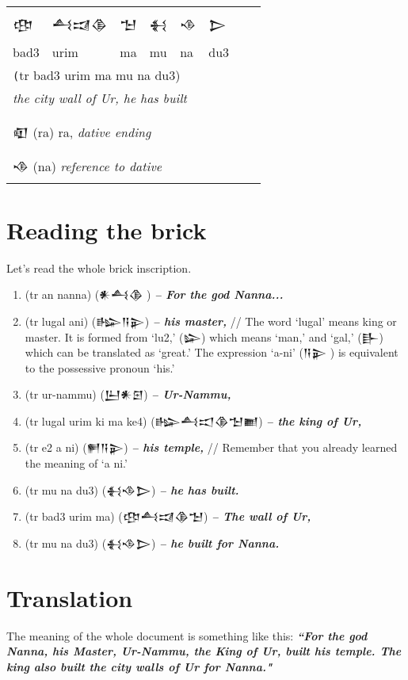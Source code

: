 \documentclass[a4paper,12pt]{book}
\newcommand{\fcn}{\setmainfont{Akkadian.otf}}
\begin{document}
\verb||\\
\begin{tabular}[!h]{l l l l l l l l}
\fcn\Large 𒂦
&\fcn\Large 𒋀𒀕𒆠 &\fcn\Large 𒈠 &
\fcn\Large 𒈬 & \fcn\Large 𒈾
& \fcn\Large  𒆕\\
  bad3 & urim & ma & mu & na & du3\\
\multicolumn{6}{l}{\texttt (tr bad3 urim ma mu na du3)}\\
\multicolumn{6}{l}{\em the city wall of Ur, he has built}\\
\hline\\
\multicolumn{5}{l}{{\fcn 𒊏}
                    (ra) ra, {\em dative ending}}\\
\multicolumn{5}{l}{{\fcn 𒈾}
                    (na) {\em reference to dative} }\\
\end{tabular} 


\section{Reading the brick}
Let's read the whole brick inscription.

\begin{enumerate}
\item (tr an nanna) ({\fcn 𒀭𒋀𒆠 }) {\bf\em-- For the god Nanna...}
\item (tr lugal ani) ({\fcn 𒈗𒀀𒉌}) {\bf\em -- his master,}
  // The word `lugal' means king or master. It is formed
  from `lu2,' ({\fcn 𒇽}) which means `man,'
  and `gal,' ({\fcn 𒃲}) which can be translated
  as `great.' The expression `a-ni' ({\fcn 𒀀𒉌 })
  is equivalent to the possessive pronoun `his.'
\item (tr ur-nammu) ({\fcn 𒌨𒀭𒇉}) {\bf\em -- Ur-Nammu,}
\item (tr lugal urim ki ma ke4) ({\fcn 𒈗𒋀𒀊𒆠𒈠𒆤})
  {\bf\em -- the king of Ur,}
\item (tr e2 a ni) ({\fcn 𒂍𒀀𒉌}) {\bf\em -- his temple,}
  // Remember that you already learned the
  meaning of `a ni.'
\item (tr mu na du3) ({\fcn 𒈬𒈾𒆕}) {\bf\em -- he has built.}
\item (tr bad3 urim ma) ({\fcn 𒂦𒋀𒀕𒆠𒈠})
  {\bf\em -- The wall of Ur,}
\item (tr mu na du3) ({\fcn 𒈬𒈾𒆕})
  {\bf\em -- he built for Nanna.}
\end{enumerate}

\section{Translation}
The meaning of the whole document is something
like this: {\bf\em``For the god Nanna, his Master,
  Ur-Nammu, the King of Ur, built his temple.
  The king also built the city walls of Ur for Nanna."}
\end{document}

